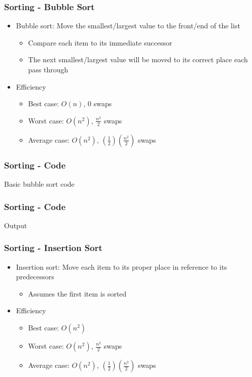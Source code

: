 \documentclass[c, aspectratio=169]{beamer}
\begin{document}
\begin{frame}\frametitle{Sorting - Bubble Sort}
\begin{itemize}
\item Bubble sort: Move the smallest/largest value to the front/end of the list
	\begin{itemize}
	\item Compare each item to its immediate successor
	\item The next smallest/largest value will be moved to its correct place each pass through
	\end{itemize}
\item Efficiency
	\begin{itemize}
	\item Best case: $O(n)$, $0$ swaps
	\item Worst case: $O(n^2)$, $\frac{n^2}{2}$ swaps
	\item Average case: $O(n^2)$, $(\frac{1}{2})(\frac{n^2}{2})$ swaps
	\end{itemize}
\end{itemize}
\end{frame}

\begin{frame}\frametitle{Sorting - Code}
Basic bubble sort code

\end{frame}

\begin{frame}\frametitle{Sorting - Code}
Output

\end{frame}

\begin{frame}\frametitle{Sorting - Insertion Sort}
\begin{itemize}
\item Insertion sort: Move each item to its proper place in reference to its predecessors
	\begin{itemize}
	\item Assumes the first item is sorted
	\end{itemize}
\item Efficiency
	\begin{itemize}
	\item Best case: $O(n^2)$
	\item Worst case: $O(n^2)$, $\frac{n^2}{2}$ swaps
	\item Average case: $O(n^2)$, $(\frac{1}{2})(\frac{n^2}{2})$ swaps
	\end{itemize}
\end{itemize}
\end{frame}
\end{document}
